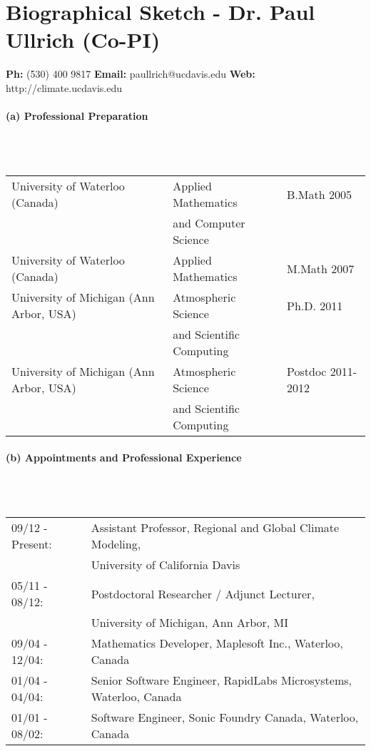 \documentclass[11pt]{article}
\begin{document}
\appendix

\setcounter{section}{5}

\section{\textbf{Biographical Sketch - Dr. Paul Ullrich (Co-PI)}}
\begin{center}
\textbf{Ph:} (530) 400 9817
\textbf{Email:} paullrich@ucdavis.edu
\textbf{Web:} http://climate.ucdavis.edu
\end{center}
\vspace{-0.3cm}
\paragraph{\large (a) Professional Preparation}\ \\ \ \\
\vspace{-0.3cm}
\begin{tabular*}{\textwidth}{@{\extracolsep{\fill}}lll}
University of Waterloo (Canada) & Applied Mathematics & B.Math 2005 \\
& \qquad and Computer Science & \\
University of Waterloo (Canada) & Applied Mathematics & M.Math 2007 \\
University of Michigan (Ann Arbor, USA) & Atmospheric Science & Ph.D. 2011 \\
& \qquad and Scientific Computing & \\
University of Michigan (Ann Arbor, USA) & Atmospheric Science & Postdoc 2011-2012 \\
& \qquad and Scientific Computing & \\
\end{tabular*}

\vspace{0.3cm}
\paragraph{\large (b) Appointments and Professional Experience}\ \\ \ \\
\vspace{-0.3cm}
\begin{tabular*}{\textwidth}{@{\extracolsep{\fill}}ll}
09/12 - Present: & Assistant Professor, Regional and Global Climate Modeling, \\
& \qquad University of California Davis \\
05/11 - 08/12: & Postdoctoral Researcher / Adjunct Lecturer, \\
& \qquad University of Michigan, Ann Arbor, MI \\
09/04 - 12/04: & Mathematics Developer, Maplesoft Inc., Waterloo, Canada \\
01/04 - 04/04: & Senior Software Engineer, RapidLabs Microsystems, Waterloo, Canada \\
01/01 - 08/02: & Software Engineer, Sonic Foundry Canada, Waterloo, Canada
\end{tabular*}
\end{document}
